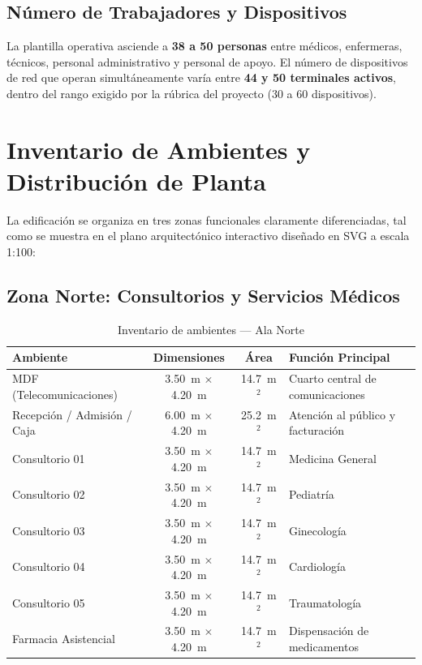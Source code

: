 \subsection{Número de Trabajadores y Dispositivos}

La plantilla operativa asciende a \textbf{38 a 50 personas} entre médicos, enfermeras, técnicos, personal administrativo y personal de apoyo. El número de dispositivos de red que operan simultáneamente varía entre \textbf{44 y 50 terminales activos}, dentro del rango exigido por la rúbrica del proyecto (30 a 60 dispositivos).

\section{Inventario de Ambientes y Distribución de Planta}

La edificación se organiza en tres zonas funcionales claramente diferenciadas, tal como se muestra en el plano arquitectónico interactivo diseñado en SVG a escala 1:100:

\subsection{Zona Norte: Consultorios y Servicios Médicos}

\begin{table}[H]
\centering
\caption{Inventario de ambientes — Ala Norte}
\begin{tabularx}{\textwidth}{@{} >{\raggedright\arraybackslash}p{5.5cm} c c X @{}}
\toprule
\textbf{Ambiente} & \textbf{Dimensiones} & \textbf{Área} & \textbf{Función Principal} \\
\midrule
MDF (Telecomunicaciones) & 3.50~m $\times$ 4.20~m & 14.7~m$^2$ & Cuarto central de comunicaciones \\
Recepción / Admisión / Caja & 6.00~m $\times$ 4.20~m & 25.2~m$^2$ & Atención al público y facturación \\
Consultorio 01 & 3.50~m $\times$ 4.20~m & 14.7~m$^2$ & Medicina General \\
Consultorio 02 & 3.50~m $\times$ 4.20~m & 14.7~m$^2$ & Pediatría \\
Consultorio 03 & 3.50~m $\times$ 4.20~m & 14.7~m$^2$ & Ginecología \\
Consultorio 04 & 3.50~m $\times$ 4.20~m & 14.7~m$^2$ & Cardiología \\
Consultorio 05 & 3.50~m $\times$ 4.20~m & 14.7~m$^2$ & Traumatología \\
Farmacia Asistencial & 3.50~m $\times$ 4.20~m & 14.7~m$^2$ & Dispensación de medicamentos \\
\bottomrule
\end{tabularx}
\label{tab:ambientes-norte}
\end{table}

